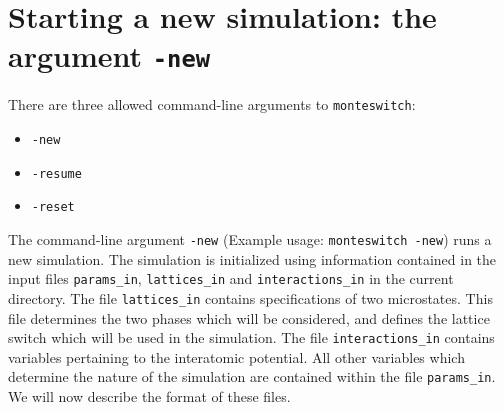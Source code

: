\documentclass{report}
\begin{document}
\section{Starting a new simulation: the argument \texttt{-new}}
There are three allowed command-line arguments to \texttt{monteswitch}: 
\begin{itemize}
\item\texttt{-new}
\item\texttt{-resume}
\item\texttt{-reset}
\end{itemize}
The command-line argument \texttt{-new} (Example usage: \texttt{monteswitch -new}) runs a new simulation. 
The simulation is initialized using information contained in the input files \texttt{params\_in}, \texttt{lattices\_in} and \texttt{interactions\_in} in
the current directory. The file \texttt{lattices\_in} contains specifications of two microstates. This file determines the two phases which will be 
considered, and defines the lattice switch which will be used in the simulation. The file \texttt{interactions\_in} contains variables pertaining to 
the interatomic potential. All other variables which determine the nature of the simulation are contained within the file \texttt{params\_in}.
We will now describe the format of these files.
\end{document}
